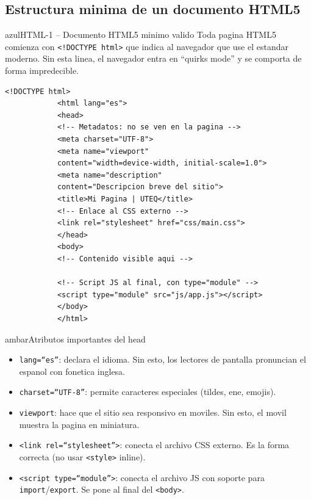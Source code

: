 \documentclass[11pt,a4paper]{article}
\begin{document}
	\subsection{Estructura minima de un documento HTML5}
	
	\begin{cajacodigo}{azul}{HTML-1 -- Documento HTML5 minimo valido}
		{\color{codigotexto}\small Toda pagina HTML5 comienza con \texttt{<!DOCTYPE html>} que indica al navegador que use el estandar moderno. Sin esta linea, el navegador entra en ``quirks mode'' y se comporta de forma impredecible.}
		\begin{lstlisting}[style=codehtml]
			<!DOCTYPE html>
			<html lang="es">
			<head>
			<!-- Metadatos: no se ven en la pagina -->
			<meta charset="UTF-8">
			<meta name="viewport"
			content="width=device-width, initial-scale=1.0">
			<meta name="description"
			content="Descripcion breve del sitio">
			<title>Mi Pagina | UTEQ</title>
			<!-- Enlace al CSS externo -->
			<link rel="stylesheet" href="css/main.css">
			</head>
			<body>
			<!-- Contenido visible aqui -->
			
			<!-- Script JS al final, con type="module" -->
			<script type="module" src="js/app.js"></script>
			</body>
			</html>
		\end{lstlisting}
	\end{cajacodigo}
	
	\begin{cajatip}{ambar}{Atributos importantes del head}
		\begin{itemize}[leftmargin=1.2em,itemsep=3pt]
			\item \texttt{lang=``es''}: declara el idioma. Sin esto, los lectores de pantalla pronuncian el espanol con fonetica inglesa.
			\item \texttt{charset=``UTF-8''}: permite caracteres especiales (tildes, ene, emojis).
			\item \texttt{viewport}: hace que el sitio sea responsivo en moviles. Sin esto, el movil muestra la pagina en miniatura.
			\item \texttt{<link rel=``stylesheet''>}: conecta el archivo CSS externo. Es la forma correcta (no usar \texttt{<style>} inline).
			\item \texttt{<script type=``module''>}: conecta el archivo JS con soporte para \texttt{import}/\texttt{export}. Se pone al final del \texttt{<body>}.
		\end{itemize}
	\end{cajatip}
	
\end{document}
